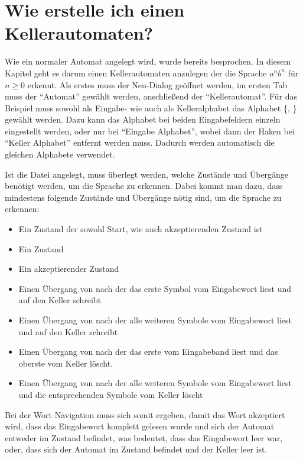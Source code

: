 \chapter{Wie erstelle ich einen Kellerautomaten?}\label{PDA}


Wie ein normaler Automat angelegt wird, wurde bereits besprochen. In diesem
Kapitel geht es darum einen Kellerautomaten anzulegen der die Sprache $a^n b^n$
für $n \geq 0$ erkennt. Als erstes muss der Neu-Dialog geöffnet werden, im ersten
Tab muss der "`Automat"' gewählt werden, anschließend der "`Kellerautomat"'. Für
das Beispiel muss sowohl als Eingabe- wie auch als Kelleralphabet das Alphabet
\{, \} gewählt werden. Dazu kann das Alphabet bei beiden
Eingabefeldern einzeln eingestellt werden, oder nur bei "`Eingabe Alphabet"',
wobei dann der Haken bei "`Keller Alphabet"' entfernt werden muss. Dadurch werden
automatisch die gleichen Alphabete verwendet.\vspace{10pt}

Ist die Datei angelegt, muss überlegt werden, welche Zustände und Übergänge
benötigt werden, um die Sprache zu erkennen. Dabei kommt man dazu, dass
mindestens folgende Zustände und Übergänge nötig sind, um die Sprache zu
erkennen:

\begin{itemize}
  \item Ein Zustand  der sowohl Start, wie auch akzeptierenden
  Zustand ist
  \item Ein Zustand 
  \item Ein akzeptierender Zustand 
  \item Einen Übergang von  nach  der das erste Symbol
   vom Eingabewort liest und auf den Keller schreibt
  \item Einen Übergang von  nach  der alle weiteren Symbole
   vom Eingabewort liest und auf den Keller schreibt
  \item Einen Übergang von  nach  der das erste 
  vom Eingabeband liest und das oberste  vom Keller löscht.
  \item Einen Übergang von  nach  der alle weiteren
  Symbole  vom Eingabewort liest und die entsprechenden Symbole
   vom Keller löscht
\end{itemize}

Bei der Wort Navigation muss sich somit ergeben, damit das Wort akzeptiert wird,
dass das Eingabewort komplett gelesen wurde und sich der Automat entweder im
Zustand  befindet, was bedeutet, dass das Eingabewort leer war, oder,
dass sich der Automat im Zustand  befindet und der Keller leer
ist.\vspace{10pt}

